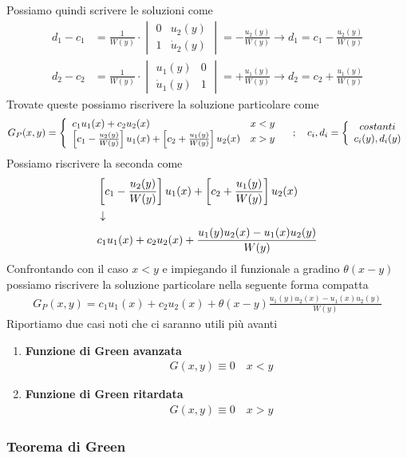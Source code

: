 Possiamo quindi scrivere le soluzioni come
\begin{align}
	d_1 - c_1 &= \frac{1}{W(y)} \cdot \begin{vmatrix}
		0 & u_2(y) \\
		1 & \dot{u}_2(y)
	\end{vmatrix} = -\frac{u_2(y)}{W(y)} \to d_1 = c_1  -\frac{u_2(y)}{W(y)}\\
	d_2 - c_2 &= \frac{1}{W(y)} \cdot \begin{vmatrix}
		u_1(y) & 0\\
		\dot{u}_1(y) & 1
	\end{vmatrix} = +\frac{u_1(y)}{W(y)} \to d_2 = c_2 +\frac{u_1(y)}{W(y)}
\end{align}
Trovate queste possiamo riscrivere la soluzione particolare come
\begin{align}
	G_P(x,y) = \double{c_1 u_1 (x) + c_2 u_2 (x) \hfill x<y}{\left[  c_1  -\frac{u_2(y)}{W(y)} \right] u_1 (x) + \left[ c_2 +\frac{u_1(y)}{W(y)} \right] u_2 (x) \quad x>y} \spacer c_i,d_i = \double{costanti}{c_i(y), d_i(y)}
\end{align}
Possiamo riscrivere la seconda come
\begin{align}
	&\left[  c_1  -\frac{u_2(y)}{W(y)} \right] u_1 (x) + \left[ c_2 +\frac{u_1(y)}{W(y)} \right] u_2 (x)\\ &\downarrow \nonumber \\
	&c_1 u_1 (x) + c_2 u_2 (x) + \frac{u_1(y)u_2(x) - u_1(x)u_2(y)}{W(y)}
\end{align}
Confrontando con il caso $x<y$ e impiegando il funzionale a gradino $\theta(x-y)$ possiamo riscrivere la soluzione particolare nella seguente forma compatta
\begin{align}
	G_P(x,y)= c_1 u_1 (x) + c_2 u_2 (x) + \theta(x-y) \frac{u_1(y)u_2(x) - u_1(x)u_2(y)}{W(y)}
\end{align}
Riportiamo due casi noti che ci saranno utili più avanti
\begin{enumerate}
	\item \textbf{Funzione di Green avanzata}
	\begin{align}
		&G(x,y) \equiv 0 \quad x<y 
	\end{align}
	\item \textbf{Funzione di Green ritardata}
	\begin{align}
		&G(x,y) \equiv 0 \quad x>y 
	\end{align}
\end{enumerate}
\newpage

\subsubsection{Teorema di Green}

